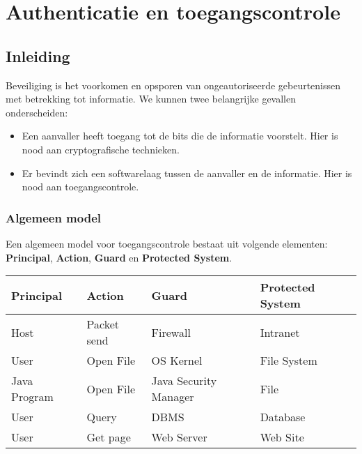 \documentclass[../main.tex]{subfiles}
\begin{document}
\chapter{Authenticatie en toegangscontrole}

\section{Inleiding}
Beveiliging is het voorkomen en opsporen van ongeautoriseerde gebeurtenissen met betrekking tot informatie. We kunnen twee belangrijke gevallen onderscheiden:
\begin{itemize}
	\item Een aanvaller heeft toegang tot de bits die de informatie voorstelt. Hier is nood aan cryptografische technieken.
	\item Er bevindt zich een softwarelaag tussen de aanvaller en de informatie. Hier is nood aan toegangscontrole. 
\end{itemize} 

\subsection{Algemeen model}
Een algemeen model voor toegangscontrole bestaat uit volgende elementen: \textbf{Principal}, \textbf{Action}, \textbf{Guard} en \textbf{Protected System}.

\begin{center}
\begin{tabular}{|l|l|l|l|}
\hline 
\textbf{Principal} & \textbf{Action} & \textbf{Guard} & \textbf{Protected System} \\ 
\hline 
Host & Packet send & Firewall & Intranet \\ 
\hline 
User & Open File & OS Kernel & File System \\ 
\hline 
Java Program & Open File & Java Security Manager & File \\ 
\hline 
User & Query & DBMS & Database \\ 
\hline 
User & Get page & Web Server  & Web Site \\ 
\hline 
\end{tabular} 
\end{center}
\end{document}
